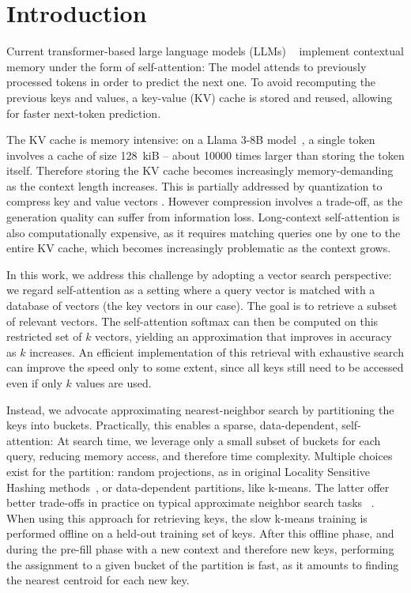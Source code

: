 
\section{Introduction}
\label{sec:intro}



Current transformer-based large language models (LLMs) ~\citep{devlin2019bertpretrainingdeepbidirectional,chowdhery2022palmscalinglanguagemodeling,brown2020language, Vaswani2017AttentionIA} implement contextual memory under the form of self-attention: The model attends to previously processed tokens in order to predict the next one.
To avoid recomputing the previous keys and values, a key-value (KV) cache is stored and reused, allowing for faster next-token prediction. 

%
%
%

The KV cache is memory intensive: on a Llama 3-8B model~\cite{dubey2024llama3herdmodels}, a single token involves a cache of size 128~kiB -- about 10000 times larger than storing the token itself.  
%
%
%
%
%
%
%
Therefore storing the KV cache becomes increasingly memory-demanding as the context length increases.
This is partially addressed by quantization to compress key and value vectors \citep{shi2024keep}. However compression involves a trade-off, as the generation quality can suffer from information loss. 
%
%
%
%
%
%
%
%
%
%
Long-context self-attention is also computationally expensive, as it requires matching queries one by one to the entire KV cache, which becomes increasingly problematic as the context grows.

In this work, we address this challenge by adopting a vector search perspective: we regard self-attention as a setting where a query vector is matched with a database of vectors (the key vectors in our case). The goal is to retrieve a subset of relevant vectors. 
The self-attention softmax can then be computed on this restricted set of $k$ vectors, yielding an approximation that improves in accuracy as $k$ increases.
%
An efficient implementation of this retrieval with exhaustive search %
%
%
%
can improve the speed only to some extent, 
since all keys still need to be accessed even if only $k$ values are used. 
%
%

Instead, we advocate approximating nearest-neighbor search by partitioning the keys into buckets. 
Practically, this enables a sparse, data-dependent, self-attention: 
At search time, we leverage only a small subset of buckets for each query, reducing memory access, and therefore time complexity.
Multiple choices exist for the partition: random projections, as in original Locality Sensitive Hashing methods~\cite{datar2004locality}, or data-dependent partitions, like k-means. The latter offer better trade-offs in practice on typical approximate neighbor search tasks ~\cite{pauleve2010locality}. 
%
%
When using this approach for retrieving keys, the slow k-means training is performed offline on a held-out training set of keys.  
After this offline phase, and during the pre-fill phase with a new context and therefore new keys, performing the assignment to a given bucket of the partition is fast, as it amounts to finding the nearest centroid for each new key. %


